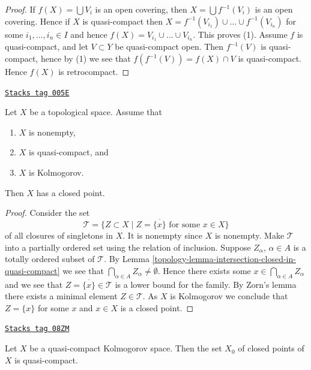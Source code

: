 \begin{proof}
If $f(X) = \bigcup V_i$ is an open covering, then $X = \bigcup f^{-1}(V_i)$
is an open covering. Hence if $X$ is quasi-compact then
$X = f^{-1}(V_{i_1}) \cup \ldots \cup f^{-1}(V_{i_n})$ for some
$i_1, \ldots, i_n \in I$ and hence
$f(X) = V_{i_1} \cup \ldots \cup V_{i_n}$. This proves (1).
Assume $f$ is quasi-compact, and let $V \subset Y$ be quasi-compact open.
Then $f^{-1}(V)$ is quasi-compact, hence by (1) we see that
$f(f^{-1}(V)) = f(X) \cap V$ is quasi-compact. Hence $f(X)$
is retrocompact.
\end{proof}

\begin{lemma}
\label{topology-lemma-quasi-compact-closed-point}
\href{https://stacks.math.columbia.edu/tag/005E}{\texttt{Stacks tag 005E}}

Let $X$ be a topological space. Assume that
\begin{enumerate}
\item $X$ is nonempty,
\item $X$ is quasi-compact, and
\item $X$ is Kolmogorov.
\end{enumerate}
Then $X$ has a closed point.
\end{lemma}

\begin{proof}

Consider the set
$$
\mathcal{T} =
\{Z \subset X \mid Z = \overline{\{x\}} \text{ for some }x \in X\}
$$
of all closures of singletons in $X$. It is nonempty since $X$ is
nonempty. Make $\mathcal{T}$ into a
partially ordered set using the relation of inclusion.
Suppose $Z_\alpha$, $\alpha \in A$ is a totally ordered subset of $\mathcal{T}$.
By Lemma \ref{topology-lemma-intersection-closed-in-quasi-compact} we see
that $\bigcap_{\alpha \in A} Z_\alpha \not = \emptyset$. Hence there exists
some $x \in \bigcap_{\alpha \in A} Z_\alpha$ and we see that
$Z = \overline{\{x\}}\in \mathcal{T}$ is a lower bound for
the family. By Zorn's lemma there exists a minimal element
$Z \in \mathcal{T}$. As $X$ is Kolmogorov we conclude that
$Z = \{x\}$ for some $x$ and $x \in X$ is a closed point.
\end{proof}

\begin{lemma}
\label{topology-lemma-closed-points-quasi-compact}
\href{https://stacks.math.columbia.edu/tag/08ZM}{\texttt{Stacks tag 08ZM}}

Let $X$ be a quasi-compact Kolmogorov space. Then the set $X_0$ of
closed points of $X$ is quasi-compact.
\end{lemma}

